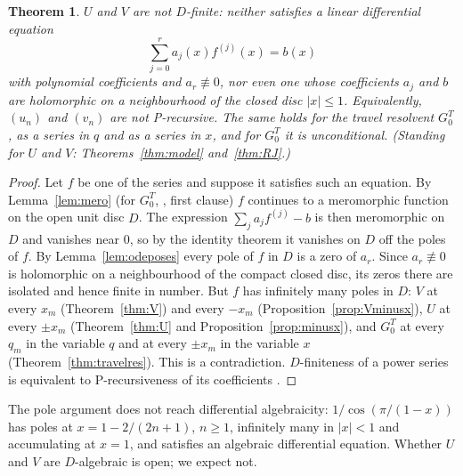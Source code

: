 \documentclass[11pt]{article}
\theoremstyle{plain}
\newtheorem{theorem}{Theorem}
\theoremstyle{definition}
\theoremstyle{remark}
\theoremstyle{plain}\newtheorem*{maintheorem}{Main Theorem}
\begin{document}
\begin{theorem}\label{thm:nonDfinite}
$U$ and $V$ are not $D$-finite: neither satisfies a linear differential equation
\[
   \textstyle\sum_{j=0}^ra_j(x)f^{(j)}(x)=b(x)
\]
with polynomial coefficients and $a_r\not\equiv0$, nor even one
whose coefficients $a_j$ and $b$ are holomorphic on a neighbourhood of the closed disc $|x|\le1$.
Equivalently, $(u_n)$ and $(v_n)$ are not P-recursive. The same holds for the travel resolvent
$G^T_0$, as a series in $q$ and as a series in $x$, and for $G^T_0$ it is unconditional.
\textup{(}Standing for $U$ and $V$: Theorems~\ref{thm:model} and~\ref{thm:RJ}.\textup{)}
\end{theorem}

\begin{proof}
Let $f$ be one of the series and suppose it satisfies such an equation. By Lemma~\ref{lem:mero}
(for $G^T_0$, {\cite[Theorem \textup{thm:blocks}]{Bonfioli2026bB}}, first clause) $f$ continues to a meromorphic function on the
open unit disc $D$. The expression $\sum_ja_jf^{(j)}-b$ is then meromorphic on $D$ and vanishes near
$0$, so by the identity theorem it vanishes on $D$ off the poles of $f$. By
Lemma~\ref{lem:odeposes} every pole of $f$ in $D$ is a zero of $a_r$. Since $a_r\not\equiv0$ is
holomorphic on a neighbourhood of the compact closed disc, its zeros there are isolated and hence
finite in number. But $f$ has infinitely many poles in $D$: $V$ at every $x_m$
(Theorem~\ref{thm:V}) and every $-x_m$ (Proposition~\ref{prop:Vminusx}), $U$ at every $\pm x_m$ (Theorem~\ref{thm:U} and
Proposition~\ref{prop:minusx}), and $G^T_0$ at every $q_m$ in the variable $q$ and at every $\pm x_m$
in the variable $x$ (Theorem~\ref{thm:travelres}). This is a contradiction. $D$-finiteness of a
power series is equivalent to P-recursiveness of its coefficients \cite[\S6.4]{StanleyEC2}.
\end{proof}

\noindent The pole argument does not reach differential algebraicity: $1/\cos(\pi/(1-x))$ has
poles at $x=1-2/(2n+1)$, $n\ge1$, infinitely many in $|x|<1$ and accumulating at $x=1$, and satisfies
an algebraic differential equation. Whether $U$ and $V$ are $D$-algebraic is open; we expect not.
\end{document}
